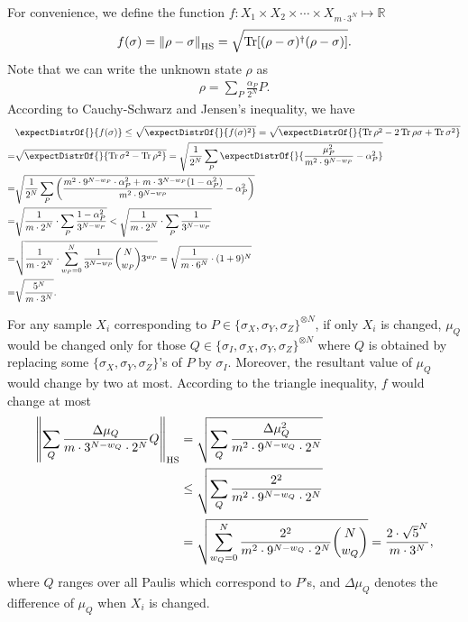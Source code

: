 For convenience, we define the function $f:X_1\times X_2\times \cdots\times X_{m\cdot 3^N}\mapsto \mathbb{R}$
\begin{align*}
f(\sigma)={\left\|\rho-\sigma\right\|}_{\text{HS}}=\sqrt{{\rm Tr}[(\rho-\sigma)^\dagger (\rho-\sigma)]}.
\end{align*}
Note that we can write the unknown state $\rho$ as
\begin{align*}
\rho=\sum_P \frac{\alpha_P}{2^N} P.
\end{align*}
According to Cauchy-Schwarz and Jensen's inequality, we have
\begin{align*}
&\expectDistrOf{}{f(\sigma)} \leq\sqrt{\expectDistrOf{}{f(\sigma)^2}} = \sqrt{\expectDistrOf{}{\tr\rho^2-2\tr \rho\sigma+\tr\sigma^2}}\\
=& \sqrt{\expectDistrOf{}{\tr\sigma^2-\tr\rho^2}}
= \sqrt{\frac{1}{2^N}\sum_P \expectDistrOf{}{\frac{\mu_P^2}{m^2\cdot 9^{N-w_P}}-\alpha_P^2}} \\
=& \sqrt{\frac{1}{2^N}\sum_P \left(\frac{m^2\cdot 9^{N-w_P}\cdot \alpha_P^2+m\cdot 3^{N-w_P}(1-\alpha_P^2)}{m^2\cdot 9^{N-w_P}}-\alpha_P^2\right)} \\
=&\sqrt{\frac{1}{m\cdot 2^N}\cdot{\sum_P \frac{1-\alpha_P^2}{3^{N-w_P}}}} < \sqrt{\frac{1}{m\cdot 2^N}\cdot{\sum_P \frac{1}{3^{N-w_P}}}}\\
=& \sqrt{\frac{1}{m\cdot 2^N}\cdot{\sum_{w_P=0}^N \frac{1}{3^{N-w_P}}{{N}\choose{w_P}}3^{w_P}}} = \sqrt{\frac{1}{m\cdot 6^N}\cdot (1+9)^N} \\
=& \sqrt{\frac{5^{\nqubits}}{m\cdot 3^N}}.
\end{align*}

For any sample $X_i$ corresponding to $P\in\{\sigma_X,\sigma_Y,\sigma_Z\}^{\otimes N}$, if only $X_i$ is changed, $\mu_Q$ would be changed only for those $Q\in\{\sigma_I,\sigma_X,\sigma_Y,\sigma_Z\}^{\otimes N}$ where
$Q$ is obtained by replacing some $\{\sigma_X,\sigma_Y,\sigma_Z\}$'s of $P$ by $\sigma_I$.
Moreover, the resultant value of $\mu_Q$ would change by two at most.
According to the triangle inequality, $f$ would change at most 
\begin{align*}
{\left\|\sum_Q  \frac{\Delta\mu_Q}{m\cdot 3^{N-w_Q}\cdot 2^N} Q\right\|}_{\text{HS}}&=\sqrt{\sum_Q \frac{\Delta\mu_Q^2}{m^2\cdot 9^{N-w_Q}\cdot 2^N}}\\
&\leq \sqrt{\sum_Q \frac{2^2}{m^2\cdot 9^{N-w_Q}\cdot 2^N}} \\
&= \sqrt{\sum_{w_Q=0}^N \frac{2^2}{m^2\cdot 9^{N-w_Q}\cdot 2^N}{{N}\choose{w_Q}}} = \frac{2\cdot \sqrt{5}^N}{m\cdot 3^N},
\end{align*}
where $Q$ ranges over all Paulis which correspond to $P$'s, and $\Delta\mu_Q$ denotes the difference of $\mu_Q$ when $X_i$ is changed.

